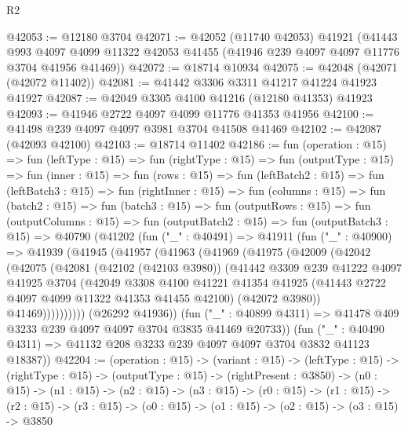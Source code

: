 \begin{lexlean}{R2}
\begin{coremodule}
@42053 := @12180 @3704
@42071 := @42052
    (@11740 @42053)
    @41921
    (@41443
      @993
      @4097
      @4099
      @11322
      @42053
      @41455
      (@41946 @239 @4097 @4097 @11776 @3704 @41956 @41469))
@42072 := @18714 @10934
@42075 := @42048 (@42071 (@42072 @11402))
@42081 := @41442 @3306 @3311 @41217 @41224 @41923 @41927
@42087 := @42049 @3305 @4100 @41216 (@12180 @41353) @41923
@42093 := @41946 @2722 @4097 @4099 @11776 @41353 @41956
@42100 := @41498 @239 @4097 @4097 @3981 @3704 @41508 @41469
@42102 := @42087 (@42093 @42100)
@42103 := @18714 @11402
@42186 := fun (operation : @15) =>
  fun (leftType : @15) =>
  fun (rightType : @15) =>
  fun (outputType : @15) =>
  fun (inner : @15) =>
  fun (rows : @15) =>
  fun (leftBatch2 : @15) =>
  fun (leftBatch3 : @15) =>
  fun (rightInner : @15) =>
  fun (columns : @15) =>
  fun (batch2 : @15) =>
  fun (batch3 : @15) =>
  fun (outputRows : @15) =>
  fun (outputColumns : @15) =>
  fun (outputBatch2 : @15) =>
  fun (outputBatch3 : @15) =>
  @40790
    (@41202
      (fun ("_" : @40491) =>
      @41911
        (fun ("_" : @40900) =>
        @41939
          (@41945
            (@41957
              (@41963
                (@41969
                  (@41975
                    (@42009
                      (@42042
                        (@42075
                          (@42081
                            (@42102 (@42103 @3980))
                            (@41442
                              @3309
                              @239
                              @41222
                              @4097
                              @41925
                              @3704
                              (@42049
                                @3308
                                @4100
                                @41221
                                @41354
                                @41925
                                (@41443 @2722 @4097 @4099 @11322 @41353 @41455 @42100)
                                (@42072 @3980))
                              @41469))))))))))
          (@26292 @41936))
        (fun ("_" : @40899 @4311) => @41478 @409 @3233 @239 @4097 @4097 @3704 @3835 @41469 @20733))
      (fun ("_" : @40490 @4311) => @41132 @208 @3233 @239 @4097 @4097 @3704 @3832 @41123 @18387))
@42204 := (operation : @15) ->
  (variant : @15) ->
  (leftType : @15) ->
  (rightType : @15) ->
  (outputType : @15) ->
  (rightPresent : @3850) ->
  (n0 : @15) ->
  (n1 : @15) ->
  (n2 : @15) ->
  (n3 : @15) ->
  (r0 : @15) ->
  (r1 : @15) ->
  (r2 : @15) -> (r3 : @15) -> (o0 : @15) -> (o1 : @15) -> (o2 : @15) -> (o3 : @15) -> @3850

\end{coremodule}
\end{lexlean}
